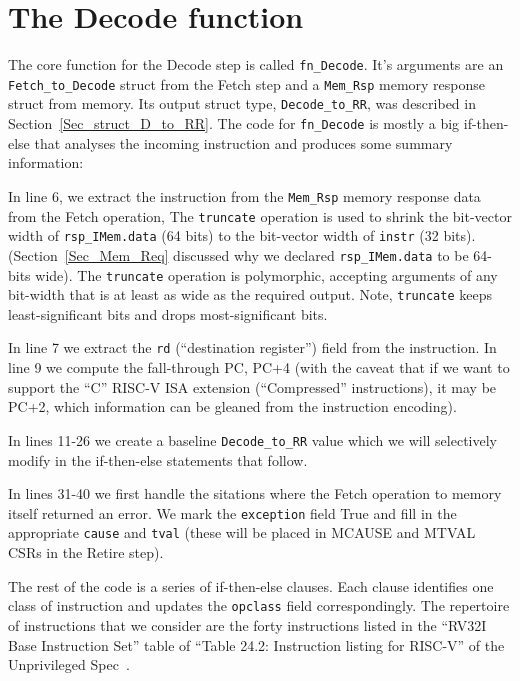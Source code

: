 \section{The Decode function}

\label{Sec_Decode_Function}


The core function for the Decode step is called \verb|fn_Decode|.
It's arguments are an \verb|Fetch_to_Decode| struct from the Fetch
step and a \verb|Mem_Rsp| memory response struct from memory.  Its
output struct type, \verb|Decode_to_RR|, was described in
Section~\ref{Sec_struct_D_to_RR}.  The code for \verb|fn_Decode| is
mostly a big if-then-else that analyses the incoming instruction and
produces some summary information:




In line 6, we extract the instruction from the \verb|Mem_Rsp| memory
response data from the Fetch operation, The \verb|truncate| operation
is used to shrink the bit-vector width of \verb|rsp_IMem.data| (64
bits) to the bit-vector width of \verb|instr| (32 bits).
(Section~\ref{Sec_Mem_Req} discussed why we declared
\verb|rsp_IMem.data| to be 64-bits wide).  The \verb|truncate|
operation is polymorphic, accepting arguments of any bit-width that is
at least as wide as the required output.  Note, \verb|truncate| keeps
least-significant bits and drops most-significant bits.

In line 7 we extract the \verb|rd| (``destination register'') field
from the instruction.  In line 9 we compute the fall-through PC, PC+4
(with the caveat that if we want to support the ``C'' RISC-V ISA
extension (``Compressed'' instructions), it may be PC+2, which
information can be gleaned from the instruction encoding).

In lines 11-26 we create a baseline \verb|Decode_to_RR| value which we
will selectively modify in the if-then-else statements that follow.

In lines 31-40 we first handle the sitations where the Fetch operation
to memory itself returned an error.  We mark the \verb|exception|
field True and fill in the appropriate \verb|cause| and \verb|tval|
(these will be placed in MCAUSE and MTVAL CSRs in the Retire step).

The rest of the code is a series of if-then-else clauses. Each clause
identifies one class of instruction and updates the \verb|opclass|
field correspondingly.  The repertoire of instructions that we
consider are the forty instructions listed in the ``RV32I Base
Instruction Set'' table of ``Table 24.2: Instruction listing for
RISC-V'' of the Unprivileged Spec~\cite{RISCV_Unpriv_2019_12_13}.

